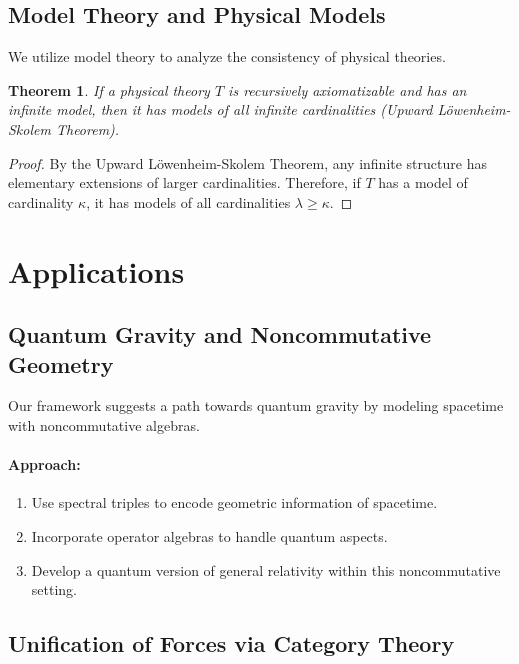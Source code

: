 \documentclass[12pt]{article}
\newtheorem{theorem}{Theorem}[section]
\begin{document}
\subsection{Model Theory and Physical Models}

We utilize model theory to analyze the consistency of physical theories.

\begin{theorem}
If a physical theory $T$ is recursively axiomatizable and has an infinite model, then it has models of all infinite cardinalities (Upward Löwenheim-Skolem Theorem).
\end{theorem}

\begin{proof}
By the Upward Löwenheim-Skolem Theorem, any infinite structure has elementary extensions of larger cardinalities. Therefore, if $T$ has a model of cardinality $\kappa$, it has models of all cardinalities $\lambda \geq \kappa$.
\end{proof}

\section{Applications}

\subsection{Quantum Gravity and Noncommutative Geometry}

Our framework suggests a path towards quantum gravity by modeling spacetime with noncommutative algebras.

\paragraph{Approach:}
\begin{enumerate}[label=\arabic*.]
    \item Use spectral triples to encode geometric information of spacetime.
    \item Incorporate operator algebras to handle quantum aspects.
    \item Develop a quantum version of general relativity within this noncommutative setting.
\end{enumerate}

\subsection{Unification of Forces via Category Theory}
\end{document}
